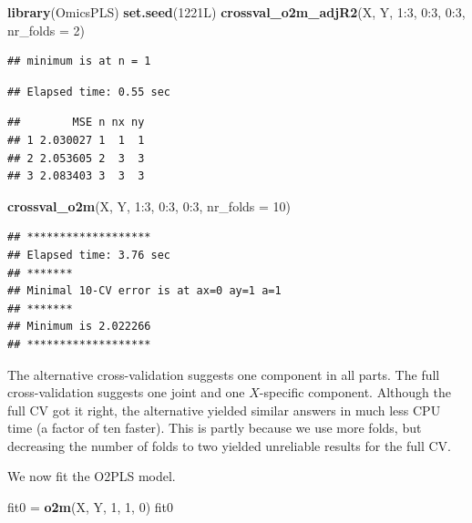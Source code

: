 \documentclass[]{article}
\newenvironment{Shaded}{\begin{snugshade}}{\end{snugshade}}
\newcommand{\KeywordTok}[1]{\textcolor[rgb]{0.13,0.29,0.53}{\textbf{{#1}}}}
\newcommand{\DataTypeTok}[1]{\textcolor[rgb]{0.13,0.29,0.53}{{#1}}}
\newcommand{\DecValTok}[1]{\textcolor[rgb]{0.00,0.00,0.81}{{#1}}}
\newcommand{\StringTok}[1]{\textcolor[rgb]{0.31,0.60,0.02}{{#1}}}
\newcommand{\NormalTok}[1]{{#1}}
\begin{document}
\begin{Shaded}
\begin{Highlighting}[]
\KeywordTok{library}\NormalTok{(OmicsPLS)}
\KeywordTok{set.seed}\NormalTok{(1221L)}
\KeywordTok{crossval_o2m_adjR2}\NormalTok{(X, Y, }\DecValTok{1}\NormalTok{:}\DecValTok{3}\NormalTok{, }\DecValTok{0}\NormalTok{:}\DecValTok{3}\NormalTok{, }\DecValTok{0}\NormalTok{:}\DecValTok{3}\NormalTok{, }\DataTypeTok{nr_folds =} \DecValTok{2}\NormalTok{)}
\end{Highlighting}
\end{Shaded}

\begin{verbatim}
## minimum is at n = 1
\end{verbatim}

\begin{verbatim}
## Elapsed time: 0.55 sec
\end{verbatim}

\begin{verbatim}
##        MSE n nx ny
## 1 2.030027 1  1  1
## 2 2.053605 2  3  3
## 3 2.083403 3  3  3
\end{verbatim}

\begin{Shaded}
\begin{Highlighting}[]
\KeywordTok{crossval_o2m}\NormalTok{(X, Y, }\DecValTok{1}\NormalTok{:}\DecValTok{3}\NormalTok{, }\DecValTok{0}\NormalTok{:}\DecValTok{3}\NormalTok{, }\DecValTok{0}\NormalTok{:}\DecValTok{3}\NormalTok{, }\DataTypeTok{nr_folds =} \DecValTok{10}\NormalTok{)}
\end{Highlighting}
\end{Shaded}

\begin{verbatim}
## *******************
## Elapsed time: 3.76 sec
## *******
## Minimal 10-CV error is at ax=0 ay=1 a=1 
## *******
## Minimum is 2.022266 
## *******************
\end{verbatim}

The alternative cross-validation suggests one component in all parts.
The full cross-validation suggests one joint and one \(X\)-specific
component. Although the full CV got it right, the alternative yielded
similar answers in much less CPU time (a factor of ten faster). This is
partly because we use more folds, but decreasing the number of folds to
two yielded unreliable results for the full CV.

We now fit the O2PLS model.

\begin{Shaded}
\begin{Highlighting}[]
\NormalTok{fit0 =}\StringTok{ }\KeywordTok{o2m}\NormalTok{(X, Y, }\DecValTok{1}\NormalTok{, }\DecValTok{1}\NormalTok{, }\DecValTok{0}\NormalTok{)}
\NormalTok{fit0}
\end{Highlighting}
\end{Shaded}
\end{document}
